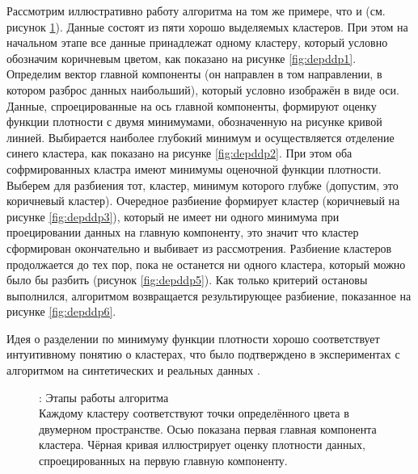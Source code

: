 \documentclass[12pt]{diploma}
\begin{document}
	Рассмотрим иллюстративно работу алгоритма \dePDDP на том же примере, что и \AWard (см. рисунок \ref{fig:depddp-working}). Данные состоят из пяти хорошо выделяемых кластеров. При этом на начальном этапе все данные принадлежат одному кластеру, который условно обозначим коричневым цветом, как показано на рисунке \ref{fig:depddp1}. Определим вектор главной компоненты (он направлен в том направлении, в котором разброс данных наибольший), который условно изображён в виде оси. Данные, спроецированные на ось главной компоненты, формируют оценку функции плотности с двумя минимумами, обозначенную на рисунке кривой линией. Выбирается наиболее глубокий минимум и осуществляется отделение синего кластера, как показано на рисунке \ref{fig:depddp2}. При этом оба софрмированных кластра имеют минимумы оценочной функции плотности. Выберем для разбиения тот, кластер, минимум которого глубже (допустим, это коричневый кластер). Очередное разбиение формирует кластер (коричневый на рисунке \ref{fig:depddp3}), который не имеет ни одного минимума при проецировании данных на главную компоненту, это значит что кластер сформирован окончательно и выбивает из рассмотрения. Разбиение кластеров продолжается до тех пор, пока не останется ни одного кластера, который можно было бы разбить (рисунок \ref{fig:depddp5}). Как только критерий остановы выполнился, алгоритмом возвращается результирующее разбиение, показанное на рисунке \ref{fig:depddp6}.
	
	Идея о разделении по минимуму функции плотности хорошо соответствует интуитивному понятию о кластерах, что было подтверждено в экспериментах с алгоритмом \dePDDP на синтетических и реальных данных \cite{enhanced-pddp,kovaleva}. 
	
	\begin{figure} %
		\centering
		\caption{\dePDDP: Этапы работы алгоритма
			\\ {\small Каждому кластеру соответствуют точки определённого цвета в двумерном пространстве. Осью показана первая главная компонента кластера. Чёрная кривая иллюстрирует оценку плотности данных, спроецированных на первую главную компоненту.}}
		\label{fig:depddp-working}
	\end{figure}
		
\end{document}
